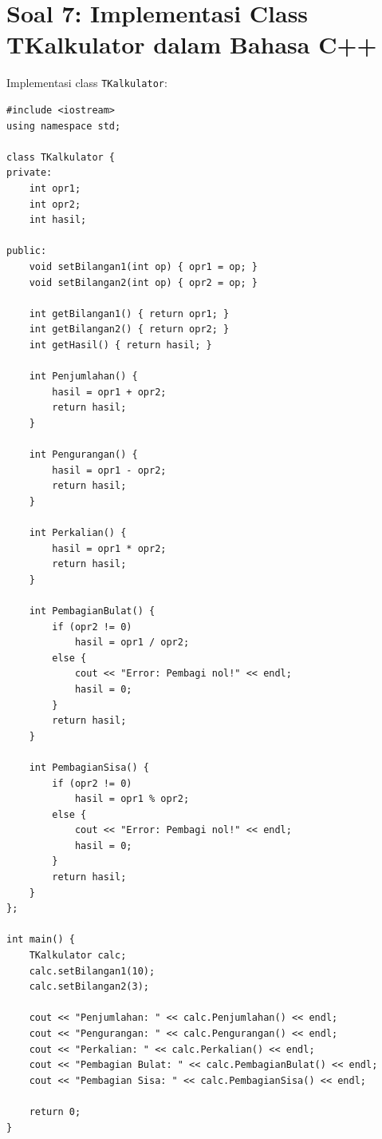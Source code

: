 \documentclass[12pt,a4paper]{article}
\begin{document}
\section{Soal 7: Implementasi Class TKalkulator dalam Bahasa C++}

Implementasi class \texttt{TKalkulator}:

\begin{verbatim}
#include <iostream>
using namespace std;

class TKalkulator {
private:
    int opr1;
    int opr2;
    int hasil;

public:
    void setBilangan1(int op) { opr1 = op; }
    void setBilangan2(int op) { opr2 = op; }

    int getBilangan1() { return opr1; }
    int getBilangan2() { return opr2; }
    int getHasil() { return hasil; }

    int Penjumlahan() {
        hasil = opr1 + opr2;
        return hasil;
    }

    int Pengurangan() {
        hasil = opr1 - opr2;
        return hasil;
    }

    int Perkalian() {
        hasil = opr1 * opr2;
        return hasil;
    }

    int PembagianBulat() {
        if (opr2 != 0)
            hasil = opr1 / opr2;
        else {
            cout << "Error: Pembagi nol!" << endl;
            hasil = 0;
        }
        return hasil;
    }

    int PembagianSisa() {
        if (opr2 != 0)
            hasil = opr1 % opr2;
        else {
            cout << "Error: Pembagi nol!" << endl;
            hasil = 0;
        }
        return hasil;
    }
};

int main() {
    TKalkulator calc;
    calc.setBilangan1(10);
    calc.setBilangan2(3);

    cout << "Penjumlahan: " << calc.Penjumlahan() << endl;
    cout << "Pengurangan: " << calc.Pengurangan() << endl;
    cout << "Perkalian: " << calc.Perkalian() << endl;
    cout << "Pembagian Bulat: " << calc.PembagianBulat() << endl;
    cout << "Pembagian Sisa: " << calc.PembagianSisa() << endl;

    return 0;
}
\end{verbatim}
\end{document}
